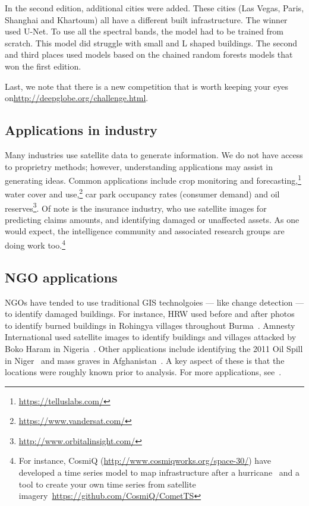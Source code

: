 \documentclass[12pt, a4paper, oneside, headinclude, footinclude]{article}
\begin{document}
In the second edition, additional cities were added. These cities (Las Vegas,
Paris, Shanghai and Khartoum) all have a different built infrastructure. The
winner used U-Net. To use all the spectral bands, the model had to be trained
from scratch. This model did struggle with small and L shaped buildings. The
second and third places used models based on the chained random forests models
that won the first edition. 

Last, we note that there is a new competition
that is worth keeping your eyes on\url{http://deepglobe.org/challenge.html}.

\subsection{Applications in industry}

Many industries use satellite data to generate information. We do not have
access to proprietry methods; however, understanding applications may assist
in generating ideas. Common applications include crop monitoring and
forecasting,\footnote{\url{https://telluslabs.com/}} water cover and
use,\footnote{\url{https://www.vandersat.com/}} car park occupancy rates
(consumer demand) and oil
reserves\footnote{\url{http://www.orbitalinsight.com/}}. Of note is the
insurance industry, who use satellite images for predicting claims amounts,
and identifying damaged or unaffected assets. As one would expect, the
intelligence community and associated research groups are doing work
too.\footnote{For instance, CosmiQ
(\url{http://www.cosmiqworks.org/space-30/}) have developed a time series
model to map infrastructure after a hurricane~\cite{cosmiq} and a tool to
create your own time series from satellite
imagery~\url{https://github.com/CosmiQ/CometTS}}

\subsection{NGO applications}


NGOs have tended to use traditional GIS technolgoies --- like change detection
--- to identify damaged buildings. For instance, HRW used before and after
photos to identify burned buildings in Rohingya villages throughout
Burma~\cite{2016Burma}. Amnesty International used
satellite images to identify buildings and villages attacked by Boko Haram in
Nigeria~\cite{2015Nigeria}. Other applications include identifying the 2011 Oil Spill in
Niger~\cite{Koettl2011} and mass graves in Afghanistan~\cite{2013AAAS}. A key
aspect of these is that the locations were roughly known prior to analysis.
For more applications, see~\cite{2014Human}. 
\end{document}
